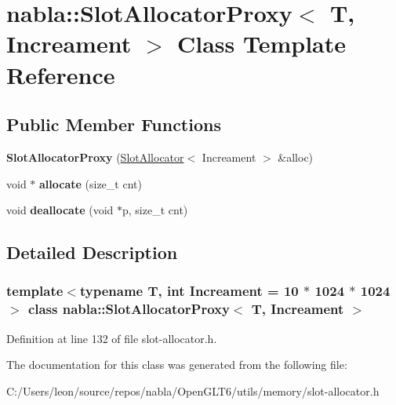 \hypertarget{classnabla_1_1_slot_allocator_proxy}{}\section{nabla\+::Slot\+Allocator\+Proxy$<$ T, Increament $>$ Class Template Reference}
\label{classnabla_1_1_slot_allocator_proxy}
\subsection*{Public Member Functions}
\begin{DoxyCompactItemize}
\item 
\mbox{\label{classnabla_1_1_slot_allocator_proxy_ae262939587a0e89fc3df0c112b5452ef}} 
{\bfseries Slot\+Allocator\+Proxy} (\mbox{\hyperlink{classnabla_1_1_slot_allocator}{Slot\+Allocator}}$<$ Increament $>$ \&alloc)
\item 
\mbox{\label{classnabla_1_1_slot_allocator_proxy_a05daafc13137ba556aa706cda7b06547}} 
void $\ast$ {\bfseries allocate} (size\+\_\+t cnt)
\item 
\mbox{\label{classnabla_1_1_slot_allocator_proxy_aea1e0a1bb27b9ca2130979566a4b4021}} 
void {\bfseries deallocate} (void $\ast$p, size\+\_\+t cnt)
\end{DoxyCompactItemize}


\subsection{Detailed Description}
\subsubsection*{template$<$typename T, int Increament = 10 $\ast$ 1024 $\ast$ 1024$>$\newline
class nabla\+::\+Slot\+Allocator\+Proxy$<$ T, Increament $>$}



Definition at line 132 of file slot-\/allocator.\+h.



The documentation for this class was generated from the following file\+:\begin{DoxyCompactItemize}
\item 
C\+:/\+Users/leon/source/repos/nabla/\+Open\+G\+L\+T6/utils/memory/slot-\/allocator.\+h\end{DoxyCompactItemize}
